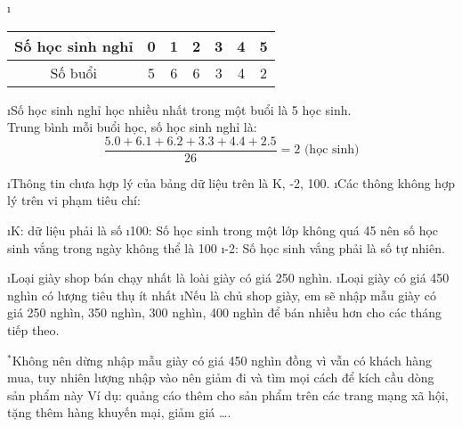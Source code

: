 \begin{Answer}{5}
		\begin{enumerate}[a),leftmargin=*]
			\i \begin{tabular}{|c|c|c|c|c|c|c|}
				\hline
				Số học sinh nghỉ&	0&	1	&2&	3&	4&	5\\
				\hline
				Số buổi&	5&	6&	6&	3&	4&	2\\
				\hline
			\end{tabular}
			\i Số học sinh nghỉ học nhiều nhất trong một buổi là 5 học sinh.\\
			Trung bình mỗi buổi học, số học sinh nghỉ là:
			\[\dfrac{{5.0 + 6.1 + 6.2 + 3.3 + 4.4 + 2.5}}{{26}} = 2 \text{ (học sinh)}\]
		\end{enumerate}
	
\end{Answer}
\begin{Answer}{6}
		\begin{enumerate}[a),leftmargin=*]
			\i Thông tin chưa hợp lý của bảng dữ liệu trên là K, -2, 100.
			\i Các thông không hợp lý trên vi phạm tiêu chí:
			\begin{enumerate}[-,leftmargin=*]
				\i K: dữ liệu phải là số
				\i 100: Số học sinh trong một lớp không quá 45 nên số học sinh vắng trong ngày không thể là 100
				\i -2: Số học sinh vắng phải là số tự nhiên.
			\end{enumerate}	
		\end{enumerate}
	
\end{Answer}
\begin{Answer}{7}
		\begin{enumerate}[--,leftmargin=*]
			\i Loại giày shop bán chạy nhất là loài giày có giá 250 nghìn.
			\i Loại giày có giá 450 nghìn có lượng tiêu thụ ít nhất
			\i Nếu là chủ shop giày, em sẽ nhập mẫu giày có giá 250 nghìn, 350 nghìn, 300  nghìn,  400 nghìn để bán nhiều hơn cho các tháng tiếp theo.
		\end{enumerate}
		$^*$Không nên dừng nhập mẫu giày có giá 450 nghìn đồng vì vẫn có khách hàng mua, tuy nhiên lượng nhập vào nên giảm đi và tìm mọi cách để kích cầu dòng sản phẩm này
		Ví dụ: quảng cáo thêm cho sản phẩm trên các trang mạng xã hội, tặng thêm hàng khuyến mại, giảm giá \ldots.
	
\end{Answer}
